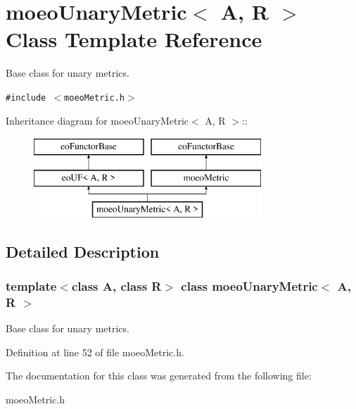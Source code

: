 \section{moeo\-Unary\-Metric$<$ A, R $>$ Class Template Reference}
\label{classmoeoUnaryMetric}
Base class for unary metrics.  


{\tt \#include $<$moeo\-Metric.h$>$}

Inheritance diagram for moeo\-Unary\-Metric$<$ A, R $>$::\begin{figure}[H]
\begin{center}
\leavevmode
\includegraphics[height=3cm]{classmoeoUnaryMetric}
\end{center}
\end{figure}


\subsection{Detailed Description}
\subsubsection*{template$<$class A, class R$>$ class moeo\-Unary\-Metric$<$ A, R $>$}

Base class for unary metrics. 



Definition at line 52 of file moeo\-Metric.h.

The documentation for this class was generated from the following file:\begin{CompactItemize}
\item 
moeo\-Metric.h\end{CompactItemize}
